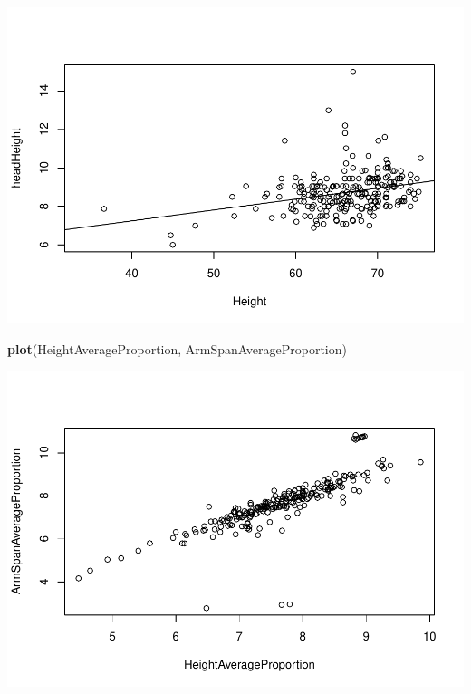 \documentclass[]{article}
\newenvironment{Shaded}{\begin{snugshade}}{\end{snugshade}}
\newcommand{\KeywordTok}[1]{\textcolor[rgb]{0.13,0.29,0.53}{\textbf{#1}}}
\newcommand{\NormalTok}[1]{#1}
\begin{document}
\includegraphics{project-measure-writeup_files/figure-latex/proportion-plots-1.pdf}

\begin{Shaded}
\begin{Highlighting}[]
\KeywordTok{plot}\NormalTok{(HeightAverageProportion, ArmSpanAverageProportion)}
\end{Highlighting}
\end{Shaded}

\includegraphics{project-measure-writeup_files/figure-latex/proportion-plots-2.pdf}
\end{document}
